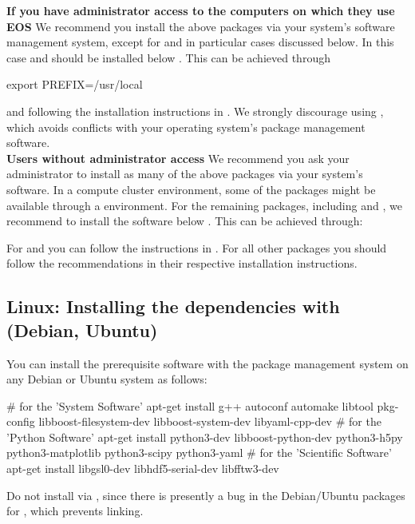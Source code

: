 \textbf{If you have administrator access to the computers on which they use EOS}\quad
We recommend you install the above packages via your system's software
management system, except for  and  in particular
cases discussed below. In this case  and  should
be installed below . This can be achieved through
\begin{commandline}
export PREFIX=/usr/local
\end{commandline}
and following the installation instructions in .
We strongly discourage using , which avoids conflicts with
your operating system's package management software.\\

\textbf{Users without administrator access}\quad
We recommend you ask your administrator to install as many of the above packages via your
system's software. In a compute cluster environment, some of the packages might be
available through a  environment. For the remaining packages,
including  and , we recommend to install the software
below . This can be achieved through:
For  and  you can follow the instructions in
. For all other packages you should follow the recommendations
in their respective installation instructions.

\subsection{Linux: Installing the dependencies with  (Debian, Ubuntu)}

You can install the prerequisite software with the  package
management system on any Debian or Ubuntu system as follows:
\begin{commandline}
# for the 'System Software'
apt-get install g++ autoconf automake libtool pkg-config libboost-filesystem-dev libboost-system-dev libyaml-cpp-dev
# for the 'Python Software'
apt-get install python3-dev libboost-python-dev python3-h5py python3-matplotlib python3-scipy python3-yaml
# for the 'Scientific Software'
apt-get install libgsl0-dev libhdf5-serial-dev libfftw3-dev
\end{commandline}
Do not install  via , since there is presently a
bug in the Debian/Ubuntu packages for , which prevents
linking.\\


